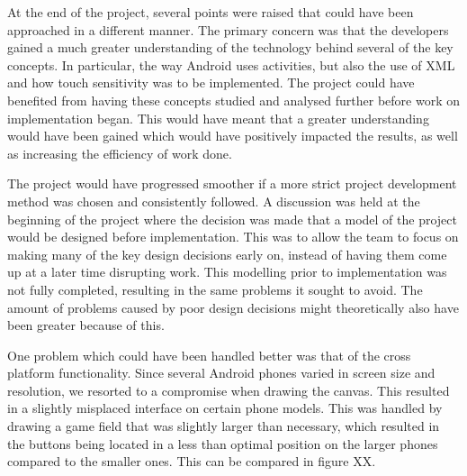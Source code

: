 At the end of the project, several points were raised that could have been approached in a different manner. The primary concern was that the developers gained a much greater understanding of the technology behind several of the key concepts. In particular, the way Android uses activities, but also the use of XML and how touch sensitivity was to be implemented. The project could have benefited from having these concepts studied and analysed further before work on implementation began. This would have meant that a greater understanding would have been gained which would have positively impacted the results, as well as increasing the efficiency of work done. 

The project would have progressed smoother if a more strict project development method was chosen and consistently followed. A discussion was held at the beginning of the project where the decision was made that a model of the project would be designed before implementation. This was to allow the team to focus on making many of the key design decisions early on, instead of having them come up at a later time disrupting work. This modelling prior to implementation was not fully completed, resulting in the same problems it sought to avoid. The amount of problems caused by poor design decisions might theoretically also have been greater because of this. 

One problem which could have been handled better was that of the cross platform functionality. Since several Android phones varied in screen size and resolution, we resorted to a compromise when drawing the canvas. This resulted in a slightly misplaced interface on certain phone models. This was handled by drawing a game field that was slightly larger than necessary, which resulted in the buttons being located in a less than optimal position on the larger phones compared to the smaller ones. This can be compared in figure XX.

